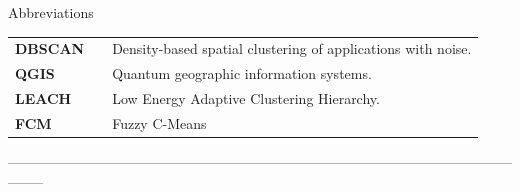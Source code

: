 

\newpage
{}
\begin{Huge}
Abbreviations\\
\end{Huge}

\begin{tabular}{ l p{0.5cm} l }
\textbf{DBSCAN} & & Density-based spatial clustering of applications with noise. \\
\textbf{QGIS} & & Quantum geographic information systems.\\
\textbf{LEACH} & & Low Energy Adaptive Clustering Hierarchy.\\
\textbf{FCM} & & Fuzzy C-Means\\
\end{tabular}


--------------------------------------------------------------------------------------------------------------------\\

